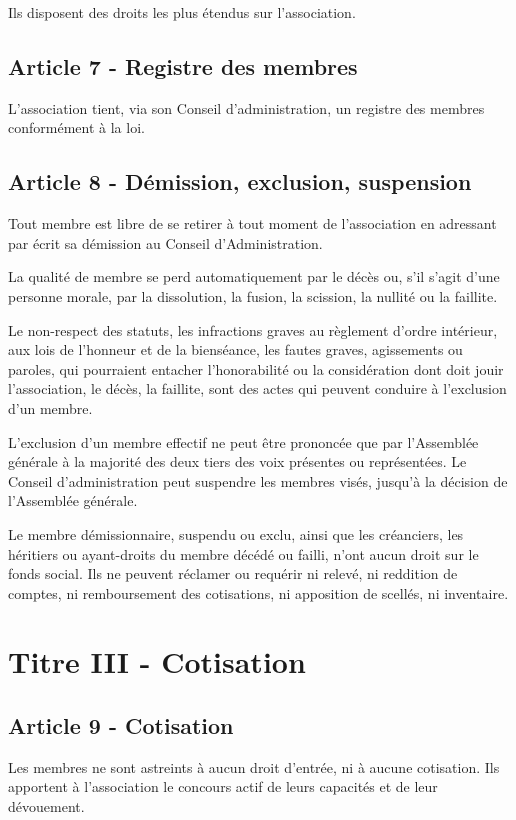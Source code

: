 \documentclass[12pt]{article}
\begin{document}
Ils disposent des droits les plus étendus sur l'association.

\subsection*{Article 7 - Registre des membres}
L'association tient, via son Conseil d'administration, un registre des membres conformément à la loi.

\subsection*{Article 8 - Démission, exclusion, suspension}
Tout membre est libre de se retirer à tout moment de l'association en adressant par écrit sa démission au Conseil d'Administration.

La qualité de membre se perd automatiquement par le décès ou, s'il s'agit d'une personne morale, par la dissolution, la fusion, la scission, la nullité ou la faillite.

Le non-respect des statuts, les infractions graves au règlement d'ordre intérieur, aux lois de l'honneur et de la bienséance, les fautes graves, agissements ou paroles, qui pourraient entacher l'honorabilité ou la considération dont doit jouir l'association, le décès, la faillite, sont des actes qui peuvent conduire à l'exclusion d'un membre.

L'exclusion d'un membre effectif ne peut être prononcée que par l'Assemblée générale à la majorité des deux tiers des voix présentes ou représentées. Le Conseil d'administration peut suspendre les membres visés, jusqu'à la décision de l'Assemblée générale.

Le membre démissionnaire, suspendu ou exclu, ainsi que les créanciers, les héritiers ou ayant-droits du membre décédé ou failli, n'ont aucun droit sur le fonds social. Ils ne peuvent réclamer ou requérir ni relevé, ni reddition de comptes, ni remboursement des cotisations, ni apposition de scellés, ni inventaire.

\section*{Titre III - Cotisation}
\subsection*{Article 9 - Cotisation}
Les membres ne sont astreints à aucun droit d'entrée, ni à aucune cotisation. Ils apportent à l'association le concours actif de leurs capacités et de leur dévouement.
\end{document}
